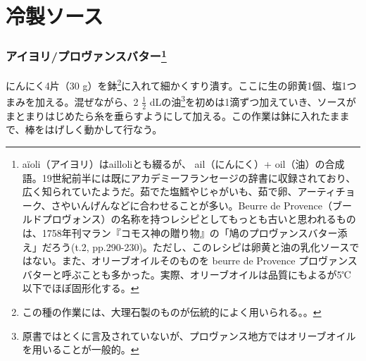 \hypertarget{ux51b7ux88fdux30bdux30fcux30b9}{%
\section{冷製ソース}\label{ux51b7ux88fdux30bdux30fcux30b9}}


\begin{recette}
\hypertarget{sauce-aioli}{%
\subsubsection[アイヨリ/プロヴァンスバター]{\texorpdfstring{アイヨリ/プロヴァンスバター\footnote{aïoli（アイヨリ）はailloliとも綴るが、
  ail（にんにく）+
  oil（油）の合成語。19世紀前半には既にアカデミーフランセージの辞書に収録されており、広く知られていたようだ。茹でた塩鱈やじゃがいも、茹で卵、アーティチョーク、さやいんげんなどに合わせることが多い。Beurre
  de
  Provence（ブールドプロヴォンス）の名称を持つレシピとしてもっとも古いと思われるものは、1758年刊マラン『コモス神の贈り物』の「鳩のプロヴァンスバター添え」だろう(t.2,
  pp.290-230)。ただし、このレシピは卵黄と油の乳化ソースではない。また、オリーブオイルそのものを
  beurre de Provence
  プロヴァンスバターと呼ぶことも多かった。実際、オリーブオイルは品質にもよるが5℃以下でほぼ固形化する。}}{アイヨリ/プロヴァンスバター}}\label{sauce-aioli}}



にんにく4片（30 g）を鉢\footnote{この種の作業には、大理石製のものが伝統的によく用いられる。。}に入れて細かくすり潰す。ここに生の卵黄1個、塩1つまみを加える。混ぜながら、2
\(\frac{1}{2}\) dLの油\footnote{原書ではとくに言及されていないが、プロヴァンス地方ではオリーブオイルを用いることが一般的。}を初めは1滴ずつ加えていき、ソースがまとまりはじめたら糸を垂らすようにして加える。この作業は鉢に入れたままで、棒をはげしく動かして行なう。


\end{recette}
